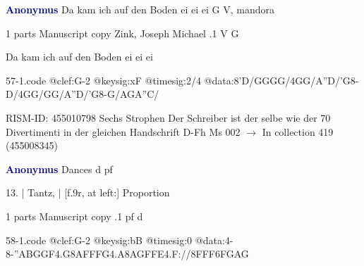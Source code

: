\documentclass[twocolumn]{book}
\begin{document}
\newline \par \vspace{7pt} \textcolor{darkblue}{\textbf{Anonymus  }}
\newline Da kam ich auf den Boden ei ei ei  G  
\newline V, mandora
\newline \begin{itshape}\end{itshape} 
\newline \textcolor{darkblue}{}  1 parts  
\newline Manuscript copy
\newline Zink, Joseph Michael
.1  V  G
\newline \begin{footnotesize} Da kam ich auf den Boden ei ei ei \end{footnotesize}  
\begin{filecontents*}{57-1.code}
@clef:G-2
@keysig:xF
@timesig:2/4
@data:8'D/GGGG/4GG/A''D/'G8-D/4GG/GG/A''D/'G8-G/AGA''C/
\end{filecontents*}
\newline
%

\newline RISM-ID: 455010798
\newline Sechs Strophen
\newline Der Schreiber ist der selbe wie der 70 Divertimenti in der gleichen Handschrift
\newline D-Fh  Ms 002
\newline $\rightarrow$ In collection 419 (455008345)

\newline \par \vspace{7pt} \textcolor{darkblue}{\textbf{Anonymus  }}
\newline Dances  d  
\newline pf
\newline \begin{itshape}[f.8v, at left:] 13. | Tantz, | [f.9r, at left:] Proportion\end{itshape} 
\newline \textcolor{darkblue}{}  1 parts  
\newline Manuscript copy
.1  pf  d  
\begin{filecontents*}{58-1.code}
@clef:G-2
@keysig:bB
@timesig:0
@data:4-8-''A{BGGF}4.G8A{FFFG}4.A8A{GFFE}4.F://8F{FF}{6FGAG}
\end{filecontents*}
\newline
%
\end{document}
